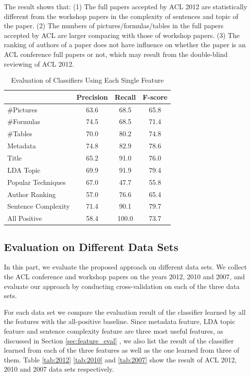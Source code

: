 \documentclass[11pt,letterpaper]{article}
\begin{document}
The result shows that:
(1) The full papers accepted by ACL 2012 are statistically 
different from the workshop papers in the complexity of sentences and topic of the paper.
(2) The numbers of pictures/formulas/tables in the full papers accepted by ACL are larger
comparing with those of workshop papers.
(3) The ranking of authors of a paper does not have influence on whether the paper 
is an ACL conference full papers or not, 
which may result from the double-blind reviewing of ACL 2012. 

\begin{table}
\begin{center}
\begin{tabular}{|p{2cm}|c|c|c|}
\hline 
& \bf Precision & \bf Recall & \bf F-score \\ \hline
\#Pictures & 63.6 & 68.5 & 65.8 \\ \hline
\#Formulas	& 74.5	& 68.5	& 71.4\\ \hline
\#Tables	&70.0 &	80.2	& 74.8\\ \hline
Metadata	& 74.8	& 82.9	& 78.6\\ \hline
Title	& 65.2	& 91.0 &	76.0\\ \hline
LDA Topic &	69.9	&91.9&	79.4\\ \hline
Popular Techniques	& 67.0	& 47.7	&55.8\\ \hline
Author Ranking	& 57.0	& 76.6	& 65.4\\ \hline
Sentence Complexity	& 71.4	& 90.1 &	79.7\\ \hline
All Positive	& 58.4	& 100.0	& 73.7\\\hline
\end{tabular}
\end{center}
\caption{Evaluation of Classifiers Using Each Single Feature}
\label{tab:feature_eval}
\end{table}



\subsection{Evaluation on Different Data Sets}
In this part, we evaluate the proposed approach on different data sets.
We collect the ACL conference and workshop papers on the years 2012, 2010 and 2007,
and evaluate our approach by conducting cross-validation on each of the three data sets.

For each data set we compare the evaluation result of the classifier learned by all the features with the all-positive baseline.
Since metadata feature, LDA topic feature and sentence complexity feature are three most useful features, as discussed in Section \ref{sec:feature_eval}
, we also list the result of the classifier learned from each of the three features as well as the one learned from three of them. 
Table \ref{tab:2012} \ref{tab:2010} and \ref{tab:2007} show the result of ACL 2012, 2010 and 2007 data sets respectively.
\end{document}
